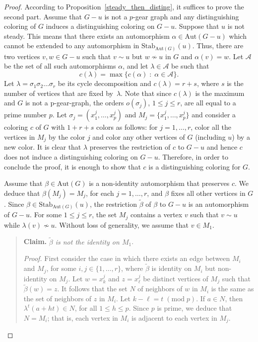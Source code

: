 \documentclass[12pt,a4paper, longbibliography]{article}
\newcommand{\aut}{\mathrm{Aut}}
\newcommand{\stab}{\mathrm{Stab}}
\theoremstyle{definition}
\numberwithin{equation}{section}
\begin{document}
\begin{proof}
		According to Proposition~\ref{steady_then_disting}, it suffices to prove the second part. Assume that $G-u$ is not a $p$-gear graph and any distinguishing coloring of $G$ induces a distinguishing coloring on $G-u$. Suppose that $u$ is not steady. This means that  there exists an automorphism $\alpha \in \aut(G-u)$ which cannot be extended to any automorphism in $\stab_{\aut(G)}(u)$. Thus, there are two vertices $v,w\in G-u$ such that  $v\sim u$ but $w\nsim u$ in $G$ and  $\alpha(v)=w$. Let $\mathcal{A}$ be the set of all such automorphisms $\alpha$, and  let $\lambda\in \mathcal{A}$  be such that 
		\[
		c(\lambda)= \max\{ c(\alpha)\;:\; \alpha \in \mathcal{A} \}.
		\]
		Let $\lambda=\sigma_1 \sigma_2 \ldots \sigma_r$ be its cycle decomposition and $c(\lambda)=r+s$, where $s$ is the number of vertices that are fixed by~$\lambda$. Note that since $c(\lambda)$ is the maximum and $G$ is not a p-gear-graph, the orders $o(\sigma_j)$, $1\leq j\leq r$, are all equal to a prime number $p$. Let $\sigma_j=(x_{1}^j,\ldots, x_{p}^j)$ and $M_j=\{x_{1}^j,\ldots, x_{p}^j\}$ and consider a coloring $c$ of $G$ with $1+r+s$ colors   as follows: for $j=1,\ldots,r$, color all the vertices in $M_j$ by the color $j$ and  color any other vertices of $G$ (including $u$) by a new color.  It is clear that $\lambda$ preserves the restriction of $c$ to $G-u$ and hence $c$ does not induce a distinguishing coloring on $G-u$.  Therefore, in order to conclude the proof, it is enough to show that $c$ is a distinguishing coloring for $G$.
		
		Assume that $\beta\in \aut(G)$ is a non-identity automorphism that preserves $c$. We deduce that $\beta(M_j)=M_j$, for each $j=1,\ldots,r$, and $\beta$ fixes all other vertices in $G$. Since $\beta\in  \stab_{\aut(G)}(u)$, the restriction $\tilde{\beta}$ of $\beta$ to $G-u$ is an automorphism of $G-u$. For some $1\leq j \leq r$, the set $M_j$ contains a vertex $v$ such that $v\sim u$ while  $\lambda(v)\nsim u$. Without loss of generality, we assume that $v\in M_1$.
		
		\begin{quotation}
			\noindent\textbf{Claim.} {\it $\tilde{\beta}$ is not the  identity on $M_1$}.
			
						
			\noindent\textit{Proof.}  First consider the case in which there exists an edge between $M_i$ and $M_j$, for some $i,j\in \{1,\ldots,r\}$, where $\tilde{\beta}$ is identity on $M_i$ but non-identity on $M_j$. Let $w=x_{k}^j$ and $z=x_{\ell}^j$ be distinct vertices of $M_j$ such that $\tilde{\beta}(w) = z$. It follows that the set $N$ of neighbors of $w$ in $M_i$ is the same as the set of neighbors of $z$ in $M_i$. Let $k - \ell = t \;(\mathrm{mod}\; p)$. If $a \in N$, then  $\lambda^t(a + ht) \in N$, for all $1 \leq h \leq p$.  Since $p$ is prime, we deduce that $N = M_i$; that is, each vertex in  $M_i$ is adjacent to each vertex in $M_j$.
			

\end{quotation}
\end{proof}
\end{document}
